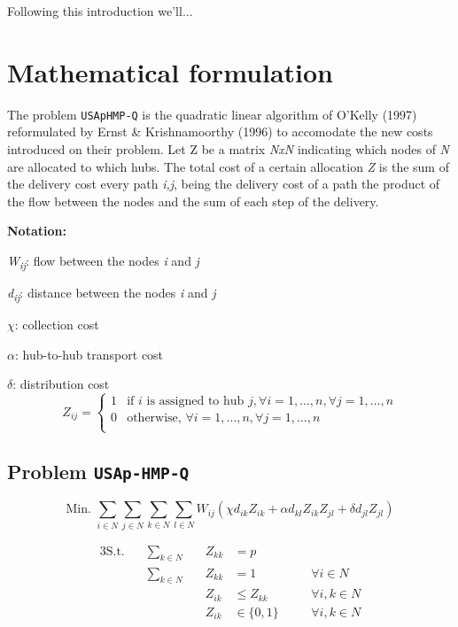 \documentclass[onecolumn]{IEEEtran}
\newcommand{\wij}{\emph{W\textsubscript{ij}}}
\def\code#1{\texttt{#1}}
\def\point#1#2{\emph{#1\textsubscript{#2}}}
\begin{document}
Following this introduction we'll... 


\section{Mathematical formulation}

The problem \code{USApHMP-Q} is the quadratic linear algorithm of O'Kelly (1997)\cite{OKelly1987}
reformulated by Ernst \& Krishnamoorthy (1996)\cite{Ernst1996} to accomodate the new costs
introduced on their problem. Let Z be a matrix \emph{NxN} indicating which nodes of \emph{N} are
allocated to which hubs. The total cost of a certain allocation \emph{Z} is the sum of the
delivery cost every path \emph{i,j}, being the delivery cost of a path the product of the
flow between the nodes and the sum of each step of the delivery.

\break

\textbf{Notation:}

\wij: flow between the nodes \emph{i} and \emph{j}

\point{d}{ij}: distance between the nodes \emph{i} and \emph{j} 

$\chi$: collection cost

$\alpha$: hub-to-hub transport cost

$\delta$: distribution cost
\[
Z_{ij} = \begin{cases}
  1 & \text{if } i \text{ is assigned to hub } j, \forall i = 1,\dots,n, \forall j = 1,\dots,n \\
  0 & \text{otherwise, }\forall i = 1,\dots,n, \forall j = 1,\dots,n \\
\end{cases}
\]

\subsection{Problem \code{USAp-HMP-Q}}

\[
  \text{Min. } \sum_{i\in N}\sum_{j\in N}\sum_{k\in N}\sum_{l\in N} W_{ij}(\chi d_{ik} Z_{ik} + \alpha d_{kl} Z_{ik} Z_{jl} + \delta d_{jl} Z_{jl})
\]

\begin{alignat}{3}
  \text{S.t.} \quad & \sum_{k \in N} & \quad Z_{kk} &= p         & \label{p_hubs}\\
                    & \sum_{k \in N} & \quad Z_{kk} &= 1         & \quad & \forall i \in N \label{single_alloc} \\
                    &                & \quad Z_{ik} &\le Z_{kk}  & \quad & \forall i, k \in N \label{only_hubs} \\
                    &                & \quad Z_{ik} &\in \{0,1\} & \quad & \forall i, k \in N \label{prev_realloc} \\
\end{alignat}
\end{document}
